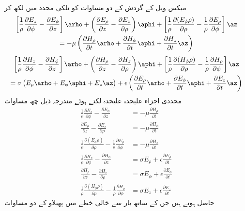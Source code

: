 میکس ویل کے  گردش کے دو مساوات  کو نلکی محدد میں لکھ کر
\begin{multline*}
\left[\frac{1}{\rho}\frac{\partial E_z}{\partial \phi} -\frac{\partial E_{\phi}}{\partial z}\right]\arho+\left(\frac{\partial E_\rho}{\partial z}-\frac{\partial E_z}{\partial \rho} \right)\aphi+\left[\frac{1}{\rho}\frac{\partial (E_{\phi}\rho )}{\partial \rho}-\frac{1}{\rho}\frac{\partial E_{\rho}}{\partial \phi}\right]\az \\
=-\mu \left(\frac{\partial H_{\rho}}{\partial t} \arho+\frac{\partial H_{\phi}}{\partial t}\aphi+\frac{\partial H_{z}}{\partial t} \az \right)
\end{multline*}
%
\begin{multline*}
\left[\frac{1}{\rho}\frac{\partial H_z}{\partial \phi} -\frac{\partial H_{\phi}}{\partial z}\right]\arho+\left(\frac{\partial H_\rho}{\partial z}-\frac{\partial H_z}{\partial \rho} \right)\aphi+\left[\frac{1}{\rho}\frac{\partial (H_{\phi}\rho )}{\partial \rho}-\frac{1}{\rho}\frac{\partial H_{\rho}}{\partial \phi}\right]\az \\
=\sigma\left(E_{\rho}\arho+E_{\phi}\aphi+E_z \az \right)+\epsilon \left(\frac{\partial E_{\rho}}{\partial t}\arho+\frac{\partial E_{\phi}}{\partial t} \aphi+\frac{\partial E_{z}}{\partial t} \az\right)
\end{multline*} 
محددی اجزاء علیحدہ علیحدہ لکتے ہوئے مندرجہ ذیل چھ مساوات
\begin{align}
\frac{1}{\rho}\frac{\partial E_z}{\partial \phi} -\frac{\partial E_{\phi}}{\partial z}&=-\mu \frac{\partial H_{\rho}}{\partial t} \label{مساوات_مویج_نلکی_الف}\\
\frac{\partial E_\rho}{\partial z}-\frac{\partial E_z}{\partial \rho}&=-\mu\frac{\partial H_{\phi}}{\partial t}\\
\frac{1}{\rho}\frac{\partial (E_{\phi}\rho )}{\partial \rho}-\frac{1}{\rho}\frac{\partial E_{\rho}}{\partial \phi} &=-\mu \frac{\partial H_{z}}{\partial t}\\
\frac{1}{\rho}\frac{\partial H_z}{\partial \phi} -\frac{\partial H_{\phi}}{\partial z}&=\sigma E_{\rho}+\epsilon \frac{\partial E_{\rho}}{\partial t}\\
\frac{\partial H_\rho}{\partial z}-\frac{\partial H_z}{\partial \rho}&=\sigma E_{\phi}+\epsilon \frac{\partial E_{\phi}}{\partial t} \\
\frac{1}{\rho}\frac{\partial (H_{\phi}\rho )}{\partial \rho}-\frac{1}{\rho}\frac{\partial H_{\rho}}{\partial \phi}&=\sigma E_z +\epsilon\frac{\partial E_{z}}{\partial t} 
\end{align}
حاصل ہوتے ہیں جن کے ساتھ بار سے خالی  خطے میں پھیلاو کے دو مساوات

